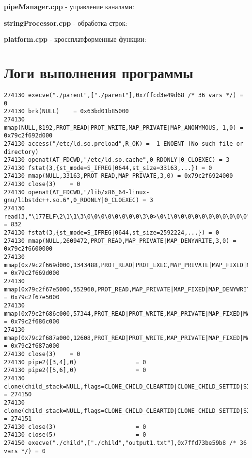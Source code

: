 \textbf{pipeManager.cpp} - управление каналами:


\textbf{stringProcessor.cpp} - обработка строк:


\textbf{platform.cpp} - кроссплатформенные функции:



\section{Логи выполнения программы}

\begin{verbatim}
274130 execve("./parent",["./parent"],0x7ffcd3e49d68 /* 36 vars */) = 0
274130 brk(NULL)    = 0x63bd01b85000
274130 mmap(NULL,8192,PROT_READ|PROT_WRITE,MAP_PRIVATE|MAP_ANONYMOUS,-1,0) = 0x79c2f692d000
274130 access("/etc/ld.so.preload",R_OK) = -1 ENOENT (No such file or directory)
274130 openat(AT_FDCWD,"/etc/ld.so.cache",0_RDONLY|0_CLOEXEC) = 3
274130 fstat(3,{st_mode=S_IFREG|0644,st_size=33163,...}) = 0
274130 mmap(NULL,33163,PROT_READ,MAP_PRIVATE,3,0) = 0x79c2f6924000
274130 close(3)    = 0
274130 openat(AT_FDCWD,"/lib/x86_64-linux-gnu/libstdc++.so.6",0_RDONLY|0_CLOEXEC) = 3
274130 read(3,"\177ELF\2\1\1\3\0\0\0\0\0\0\0\0\3\0>\0\1\0\0\0\0\0\0\0\0\0\0\0"...,832) = 832
274130 fstat(3,{st_mode=S_IFREG|0644,st_size=2592224,...}) = 0
274130 mmap(NULL,2609472,PROT_READ,MAP_PRIVATE|MAP_DENYWRITE,3,0) = 0x79c2f6600000
274130 mmap(0x79c2f669d000,1343488,PROT_READ|PROT_EXEC,MAP_PRIVATE|MAP_FIXED|MAP_DENYWRITE,3,0x9d000) = 0x79c2f669d000
274130 mmap(0x79c2f67e5000,552960,PROT_READ,MAP_PRIVATE|MAP_FIXED|MAP_DENYWRITE,3,0x1e5000) = 0x79c2f67e5000
274130 mmap(0x79c2f686c000,57344,PROT_READ|PROT_WRITE,MAP_PRIVATE|MAP_FIXED|MAP_DENYWRITE,3,0x26b000) = 0x79c2f686c000
274130 mmap(0x79c2f687a000,12608,PROT_READ|PROT_WRITE,MAP_PRIVATE|MAP_FIXED|MAP_ANONYMOUS,-1,0) = 0x79c2f687a000
274130 close(3)    = 0
274130 pipe2([3,4],0)                 = 0
274130 pipe2([5,6],0)                 = 0
274130 clone(child_stack=NULL,flags=CLONE_CHILD_CLEARTID|CLONE_CHILD_SETTID|SIGCHLD,child_tidptr=0x79c2f68f1a10) = 274150
274130 clone(child_stack=NULL,flags=CLONE_CHILD_CLEARTID|CLONE_CHILD_SETTID|SIGCHLD,child_tidptr=0x79c2f68f1a10) = 274151
274130 close(3)                       = 0
274130 close(5)                       = 0
274150 execve("./child",["./child","output1.txt"],0x7ffd73be59b8 /* 36 vars */) = 0

\end{verbatim}
